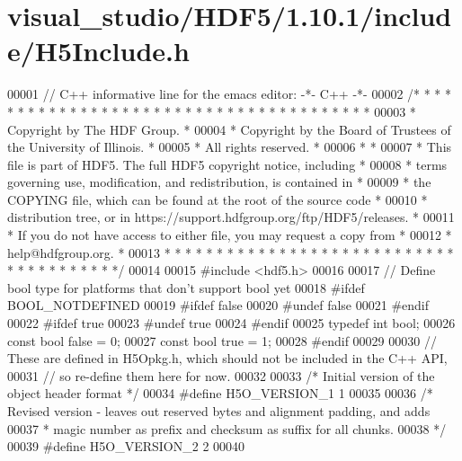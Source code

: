 \hypertarget{visual__studio_2_h_d_f5_21_810_81_2include_2_h5_include_8h_source}{}\section{visual\+\_\+studio/\+H\+D\+F5/1.10.1/include/\+H5\+Include.h}
\label{visual__studio_2_h_d_f5_21_810_81_2include_2_h5_include_8h_source}

\begin{DoxyCode}
00001 \textcolor{comment}{// C++ informative line for the emacs editor: -*- C++ -*-}
00002 \textcolor{comment}{/* * * * * * * * * * * * * * * * * * * * * * * * * * * * * * * * * * * * * * *}
00003 \textcolor{comment}{ * Copyright by The HDF Group.                                               *}
00004 \textcolor{comment}{ * Copyright by the Board of Trustees of the University of Illinois.         *}
00005 \textcolor{comment}{ * All rights reserved.                                                      *}
00006 \textcolor{comment}{ *                                                                           *}
00007 \textcolor{comment}{ * This file is part of HDF5.  The full HDF5 copyright notice, including     *}
00008 \textcolor{comment}{ * terms governing use, modification, and redistribution, is contained in    *}
00009 \textcolor{comment}{ * the COPYING file, which can be found at the root of the source code       *}
00010 \textcolor{comment}{ * distribution tree, or in https://support.hdfgroup.org/ftp/HDF5/releases.  *}
00011 \textcolor{comment}{ * If you do not have access to either file, you may request a copy from     *}
00012 \textcolor{comment}{ * help@hdfgroup.org.                                                        *}
00013 \textcolor{comment}{ * * * * * * * * * * * * * * * * * * * * * * * * * * * * * * * * * * * * * * */}
00014 
00015 \textcolor{preprocessor}{#include <hdf5.h>}
00016 
00017 \textcolor{comment}{// Define bool type for platforms that don't support bool yet}
00018 \textcolor{preprocessor}{#ifdef BOOL\_NOTDEFINED}
00019 \textcolor{preprocessor}{#ifdef false}
00020 \textcolor{preprocessor}{#undef false}
00021 \textcolor{preprocessor}{#endif}
00022 \textcolor{preprocessor}{#ifdef true}
00023 \textcolor{preprocessor}{#undef true}
00024 \textcolor{preprocessor}{#endif}
00025 \textcolor{keyword}{typedef} \textcolor{keywordtype}{int} bool;
00026 \textcolor{keyword}{const} \textcolor{keywordtype}{bool}  \textcolor{keyword}{false} = 0;
00027 \textcolor{keyword}{const} \textcolor{keywordtype}{bool}  \textcolor{keyword}{true}  = 1;
00028 \textcolor{preprocessor}{#endif}
00029 
00030 \textcolor{comment}{// These are defined in H5Opkg.h, which should not be included in the C++ API,}
00031 \textcolor{comment}{// so re-define them here for now.}
00032 
00033 \textcolor{comment}{/* Initial version of the object header format */}
00034 \textcolor{preprocessor}{#define H5O\_VERSION\_1    1}
00035 
00036 \textcolor{comment}{/* Revised version - leaves out reserved bytes and alignment padding, and adds}
00037 \textcolor{comment}{ *      magic number as prefix and checksum as suffix for all chunks.}
00038 \textcolor{comment}{ */}
00039 \textcolor{preprocessor}{#define H5O\_VERSION\_2    2}
00040 
\end{DoxyCode}
